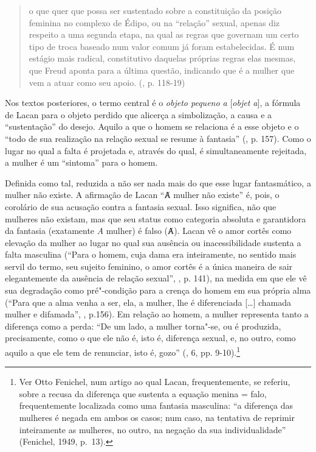 \begin{quote}
o que quer que possa ser sustentado sobre a constituição da posição
feminina no complexo de Édipo, ou na ``relação'' sexual, apenas diz
respeito a uma segunda etapa, na qual as regras que governam um certo
tipo de troca baseado num valor comum já foram estabelecidas. É num
estágio mais radical, constitutivo daquelas próprias regras elas mesmas,
que Freud aponta para a última questão, indicando que é a mulher que vem
a atuar como seu apoio. (, p. 118-19)
\end{quote}

Nos textos posteriores, o termo central é o \emph{objeto pequeno a}
{[}\emph{objet a}{]}, a fórmula de Lacan para o objeto perdido que
alicerça a simbolização, a causa e a ``sustentação'' do desejo. Aquilo a
que o homem se relaciona é a esse objeto e o ``todo de sua realização na
relação sexual se resume à fantasia'' (, p. 157). Como o lugar
no qual a falta é projetada e, através do qual, é simultaneamente
rejeitada, a mulher é um ``sintoma'' para o homem.

Definida como tal, reduzida a não ser nada mais do que esse lugar
fantasmático, a mulher não existe. A afirmação de Lacan ``Ⱥ mulher não
existe'' é, pois, o corolário de sua acusação contra a fantasia sexual.
Isso significa, não que mulheres não existam, mas que seu status como
categoria absoluta e garantidora da fantasia (exatamente \emph{A}
mulher) é falso (Ⱥ). Lacan vê o amor cortês como elevação da mulher ao
lugar no qual sua ausência ou inacessibilidade sustenta a falta
masculina (``Para o homem, cuja dama era inteiramente, no sentido mais
servil do termo, seu sujeito feminino, o amor cortês é a única maneira
de sair elegantemente da ausência de relação sexual'', , p.
141), na medida em que ele vê sua degradação como pré"-condição para a
crença do homem em sua própria alma (``Para que a alma venha a ser, ela,
a mulher, lhe é diferenciada {[}\ldots{}{]} chamada mulher e difamada'',
, p.156). Em relação ao homem, a mulher representa tanto a
diferença como a perda: ``De um lado, a mulher torna"-se, ou é produzida,
precisamente, como o que ele não é, isto é, diferença sexual, e, no
outro, como aquilo a que ele tem de renunciar, isto é, gozo'' (,
6, pp. 9-10).\footnote{Ver Otto Fenichel, num artigo ao qual Lacan,
  frequentemente, se referiu, sobre a recusa da diferença que sustenta a
  equação menina = falo, frequentemente localizada como uma fantasia
  masculina: ``a diferença das mulheres é negada em ambos os casos; num
      caso, na tentativa de reprimir inteiramente as mulheres, no outro, na
      negação da sua individualidade'' (Fenichel, 1949, p.~13).}

